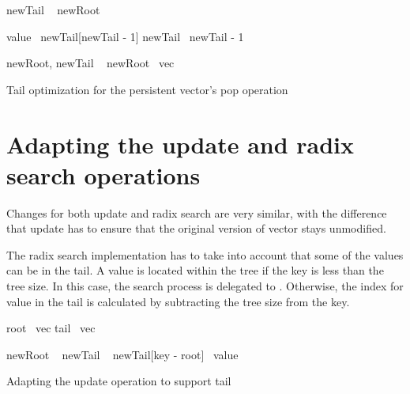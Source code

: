 \begin{listing}[!ht]

    \begin{algorithmic}[1]

        \State newTail \la\ 
        \State newRoot \la\ \nil{}

        \State value \la\ newTail[newTail - 1]
        \State newTail \la\ newTail - 1

            \State newRoot, newTail \la\ 
        \Else
            \State newRoot \la\ vec
        \EndIf

        \State \Return {}
        \EndFunction
    \end{algorithmic}

    \caption{Tail optimization for the persistent vector’s pop operation}
    \label{lst:tail-pop}
\end{listing}

\section{Adapting the update and radix search operations}
Changes for both update and radix search are very similar, with the difference that update has to ensure that the original version of vector stays unmodified.

The radix search implementation has to take into account that some of the values can be in the tail. A value is located within the tree if the key is less than the tree size. In this case, the search process is delegated to \treerrb{}. Otherwise, the index for value in the tail is calculated by subtracting the tree size from the key.

\begin{listing}[!ht]

    \begin{algorithmic}[1]

        \State root \la\ vec
        \State tail \la\ vec

            \State newRoot \la\ 
            \State \Return {}
        \Else
            \State newTail \la\ 
            \State newTail[key - root] \la\ value
            \State \Return {}
        \EndIf
        \EndFunction
    \end{algorithmic}

    \caption{Adapting the update operation to support tail}
    \label{lst:tail-update}
\end{listing}

